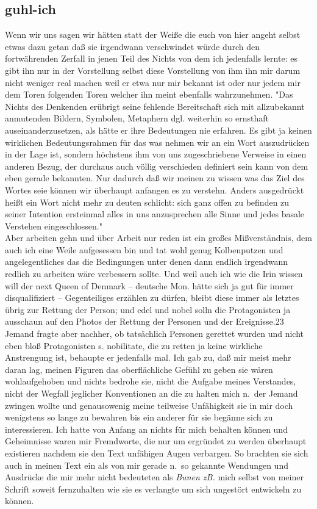 \documentclass[
]{article}
\author{}
\date{\vspace{-2.5em}}
\begin{document}
\subsection{guhl-ich}\label{guhl-ich}

Wenn wir uns sagen wir hätten statt der Weiße die euch von hier angeht
selbst etwas dazu getan daß sie irgendwann verschwindet würde durch den
fortwährenden Zerfall in jenen Teil des Nichts von dem ich jedenfalls
lernte: es gibt ihn nur in der Vorstellung selbst diese Vorstellung von
ihm ihn mir darum nicht weniger real machen weil er etwa nur mir bekannt
ist oder nur jedem mir dem Toren folgenden Toren welcher ihn meint
ebenfalls wahrzunehmen. "Das Nichts des Denkenden erübrigt seine
fehlende Bereitschaft sich mit allzubekannt anmutenden Bildern,
Symbolen, Metaphern dgl. weiterhin so ernsthaft auseinanderzusetzen, als
hätte er ihre Bedeutungen nie erfahren. Es gibt ja keinen wirklichen
Bedeutungsrahmen für das was nehmen wir an ein Wort auszudrücken in der
Lage ist, sondern höchstens ihm von uns zugeschriebene Verweise in einen
anderen Bezug, der durchaus auch völlig verschieden definiert sein kann
von dem eben gerade bekannten. Nur dadurch daß wir meinen zu wissen was
das Ziel des Wortes seie können wir überhaupt anfangen es zu verstehn.
Anders ausgedrückt heißt ein Wort nicht mehr zu deuten schlicht: sich
ganz offen zu befinden zu seiner Intention ersteinmal alles in uns
anzusprechen alle Sinne und jedes basale Verstehen eingeschlossen."\\
Aber arbeiten gehn und über Arbeit nur reden ist ein großes
Mißverständnis, dem auch ich eine Weile aufgesessen bin und tat wohl
genug Kolbenputzen und angelegentliches das die Bedingungen unter denen
dann endlich irgendwann redlich zu arbeiten wäre verbessern sollte. Und
weil auch ich wie die Irin wissen will der next Queen of Denmark --
deutsche Mon. hätte sich ja gut für immer disqualifiziert --
Gegenteiliges erzählen zu dürfen, bleibt diese immer als letztes übrig
zur Rettung der Person; und edel und nobel solln die Protagonisten ja
ausschaun auf den Photos der Rettung der Personen und der
Ereignisse.23\\
Jemand fragte aber nachher, ob tatsächlich Personen gerettet wurden und
nicht eben bloß Protagonisten s. nobilitate, die zu retten ja keine
wirkliche Anstrengung ist, behaupte er jedenfalls mal. Ich gab zu, daß
mir meist mehr daran lag, meinen Figuren das oberflächliche Gefühl zu
geben sie wären wohlaufgehoben und nichts bedrohe sie, nicht die Aufgabe
meines Verstandes, nicht der Wegfall jeglicher Konventionen an die zu
halten mich n.~der Jemand zwingen wollte und genausowenig meine
teilweise Unfähigkeit sie in mir doch wenigstens so lange zu bewahren
bis ein anderer für sie begänne sich zu interessieren. Ich hatte von
Anfang an nichts für mich behalten können und Geheimnisse waren mir
Fremdworte, die nur um ergründet zu werden überhaupt existieren nachdem
sie den Text unfähigen Augen verbargen. So brachten sie sich auch in
meinen Text ein als von mir gerade n.~so gekannte Wendungen und
Ausdrücke die mir mehr nicht bedeuteten als \emph{Bunen zB.} mich selbst
von meiner Schrift soweit fernzuhalten wie sie es verlangte um sich
ungestört entwickeln zu können.
\end{document}
